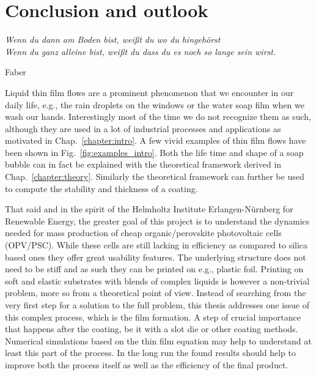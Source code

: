 \chapter{Conclusion and outlook}
\label{chapter:conclusion}
\epigraph{\textit{Wenn du dann am Boden bist, weißt du wo du hingehörst\\ Wenn du ganz alleine bist, weißt du dass du es noch so lange sein wirst.}}{Faber}

Liquid thin film flows are a prominent phenomenon that we encounter in our daily life, e.g., the rain droplets on the windows or the water soap film when we wash our hands.
Interestingly most of the time we do not recognize them as such, although they are used in a lot of industrial processes and applications as motivated in Chap.~\ref{chapter:intro}.
A few vivid examples of thin film flows have been shown in Fig.~\ref{fig:examples_intro}. 
Both the life time and shape of a soap bubble can in fact be explained with the theoretical framework derived in Chap.~\ref{chapter:theory}.
Similarly the theoretical framework can further be used to compute the stability and thickness of a coating.

That said and in the spirit of the Helmholtz Institute Erlangen-Nürnberg for Renewable Energy, the greater goal of this project is to understand the dynamics needed for mass production of cheap organic/perovskite photovoltaic cells (OPV/PSC).
While these cells are still lacking in efficiency as compared to silica based ones they offer great usability features.
The underlying structure does not need to be stiff and as such they can be printed on e.g., plastic foil.
Printing on soft and elastic substrates with blends of complex liquids is however a non-trivial problem, more so from a theoretical point of view.
Instead of searching from the very first step for a solution to the full problem, this thesis addresses one issue of this complex process, which is the film formation.
A step of crucial importance that happens after the coating, be it with a slot die or other coating methods.
Numerical simulations based on the thin film equation may help to understand at least this part of the process.
In the long run the found results should help to improve both the process itself as well as the efficiency of the final product.

